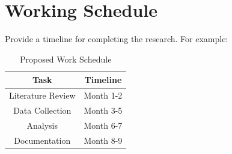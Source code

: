 \documentclass[12pt, a4paper]{report}
\begin{document}
\chapter{Working Schedule}
Provide a timeline for completing the research. For example:

\begin{table}[h!]
    \caption{Proposed Work Schedule}
    \centering
    \begin{tabular}{|c|c|}
        \hline
        Task & Timeline \\ \hline
        Literature Review & Month 1-2 \\ \hline
        Data Collection & Month 3-5 \\ \hline
        Analysis & Month 6-7 \\ \hline
        Documentation & Month 8-9 \\ \hline
    \end{tabular}
    \label{tab:work_schedule}
\end{table}


\end{document}
